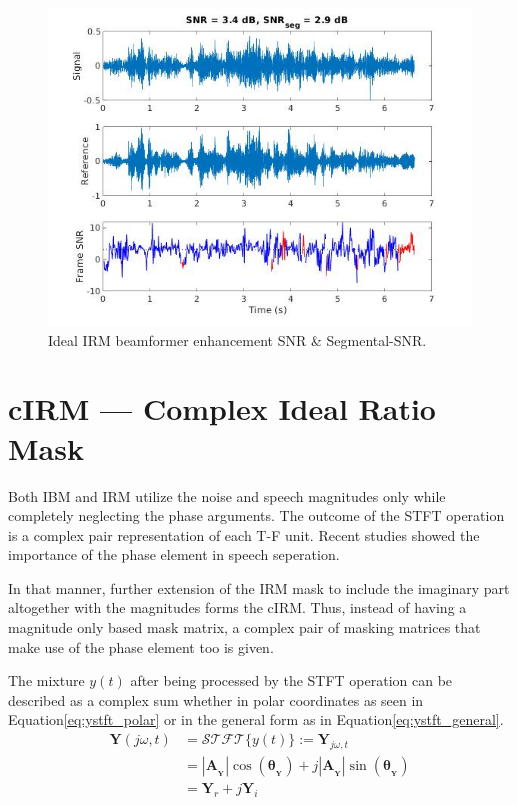 \begin{figure}[H]
    \centering
    \includegraphics[width=\linewidth]{Features/images/irm_ideal_snr}
    \caption{Ideal IRM beamformer enhancement SNR \& Segmental-SNR.}\label{fig:irm_ideal_snr}
\end{figure}



\section{cIRM --- Complex Ideal Ratio Mask}\label{ssec:cirm}
Both IBM and IRM utilize the noise and speech magnitudes only
while completely neglecting the phase arguments.
The outcome of the STFT operation is a complex pair
representation of each T-F unit. Recent studies
showed the importance of 
the phase element in 
speech seperation\cite{7364200,Xia2017UsingOR}.

In that manner, further extension of the IRM mask 
to include the imaginary part 
altogether with the magnitudes forms the cIRM. 
Thus, instead of having a magnitude only based mask matrix, a complex
pair of masking matrices that make use of the phase element too is given.

The mixture \(y(t)\) after being processed by
the STFT operation can be described as a complex sum
whether in polar coordinates as seen in Equation\ref{eq:ystft_polar}
or in the general form as in Equation\ref{eq:ystft_general}.
\begin{align}\label{eq:ystft_polar}
    \mathbf{Y}(j\omega, t)  & = \mathcal{STFT} \{ y(t) \} := \mathbf{Y}_{j\omega, t} \nonumber \\
                            & = |\mathbf{A}_{_{\mathbf{Y}}}|\cos(\bm{\theta}_{_{\mathbf{Y}}}) 
                            + j|\mathbf{A}_{_{\mathbf{Y}}}|\sin(\bm{\theta}_{_{\mathbf{Y}}}) \\
\label{eq:ystft_general}      & = \mathbf{Y}_{r} + j\mathbf{Y}_{i}
\end{align}

